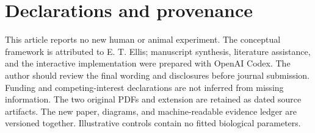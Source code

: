 \section*{Declarations and provenance}

This article reports no new human or animal experiment. The conceptual framework is attributed to E. T. Ellis; manuscript synthesis, literature assistance, and the interactive implementation were prepared with OpenAI Codex. The author should review the final wording and disclosures before journal submission. Funding and competing-interest declarations are not inferred from missing information. The two original PDFs and extension are retained as dated source artifacts. The new paper, diagrams, and machine-readable evidence ledger are versioned together. Illustrative controls contain no fitted biological parameters.
